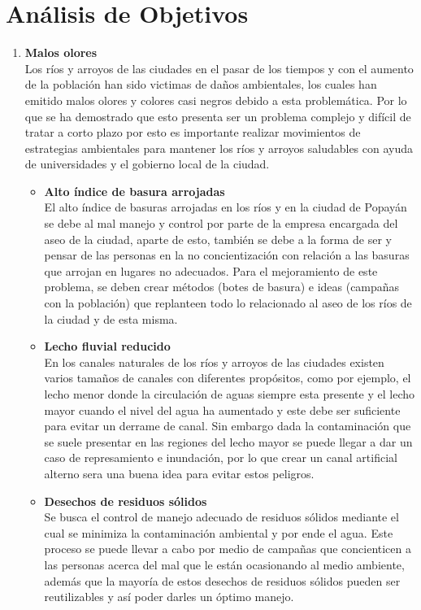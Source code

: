 \section{Análisis de Objetivos}
\vspace{-5mm}


\begin{enumerate}
	\item \textbf{Malos olores}\\
	      Los ríos y arroyos de las ciudades en el pasar de los tiempos y con el aumento de la población han sido victimas de daños ambientales, los cuales han emitido malos olores y colores casi negros debido a esta problemática. Por lo que se ha demostrado que esto presenta ser un problema complejo y difícil de tratar a corto plazo por esto es importante realizar movimientos de estrategias ambientales para mantener los ríos y arroyos saludables con ayuda de universidades y el gobierno local de la ciudad.
	      \begin{itemize}
		      \item \textbf{Alto índice de basura arrojadas}\\
		            El alto índice de basuras arrojadas en los ríos y en la ciudad de Popayán se debe al mal manejo y control por parte de la empresa encargada del aseo de la ciudad, aparte de esto, también se debe a la forma de ser y pensar de las personas en la no concientización con relación a las basuras que arrojan en lugares no adecuados. Para el mejoramiento de este problema, se deben crear métodos (botes de basura) e ideas (campañas con la población) que replanteen todo lo relacionado al aseo de los ríos de la ciudad y de esta misma.

		      \item \textbf{Lecho fluvial reducido} \\
		            En los canales naturales de los ríos y arroyos de las ciudades existen varios tamaños de canales con diferentes propósitos, como por ejemplo, el lecho menor donde la circulación de aguas siempre esta presente y el lecho mayor cuando el nivel del agua ha aumentado y este debe ser suficiente para evitar un derrame de canal. Sin embargo dada la contaminación que se suele presentar en las regiones del lecho mayor se puede llegar a dar un caso de represamiento e inundación, por lo que crear un canal artificial alterno sera una buena idea para evitar estos peligros.
		      \item \textbf{Desechos de residuos sólidos}\\
		            Se busca el control de manejo adecuado de residuos sólidos mediante el cual se minimiza la contaminación ambiental y por ende el agua. Este proceso se puede llevar a cabo por medio de campañas que concienticen a las personas acerca del mal que le están ocasionando al medio ambiente, además que la mayoría de estos desechos de residuos sólidos pueden ser reutilizables y así poder darles un óptimo manejo.


\end{itemize}
\end{enumerate}
